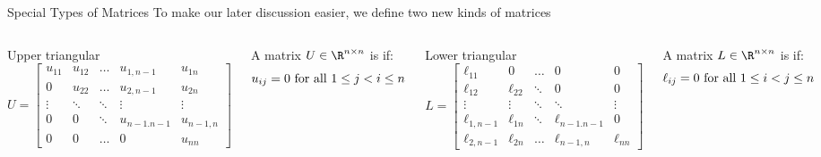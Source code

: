 \documentclass[xcoler=dvipsnames, aspectratio=169]{beamer}
\begin{document}
    \begin{frame}{Special Types of Matrices}
        To make our later discussion easier, we define two new kinds of matrices\pause
        \begin{columns}
            Upper triangular
            \pause
            \[
                U = \begin{bmatrix}
                    u_{11} & u_{12} & \dots & u_{1,n-1}& u_{1n}\\
                    0 & u_{22} & \dots & u_{2,n-1} & u_{2n}\\
                    \vdots & \ddots & \ddots & \vdots & \vdots\\
                    0 & 0 & \ddots & u_{n-1.n-1} & u_{n-1,n}\\
                    0 & 0 & \dots & 0 & u_{nn}
                \end{bmatrix}
            \]
            \pause
            \begin{defn}
                A matrix $U\in\R^{n\times n}$ is  if:\pause
                \[
                    u_{ij} = 0 \textnormal{ for all } 1\leq j < i \leq n
                \]
            \end{defn}
            Lower triangular
            \pause
            \[
                L = \begin{bmatrix}
                    \ell_{11}   & 0 & \dots  &0           & 0 \\
                    \ell_{12}   & \ell_{22} & \ddots  &0           & 0 \\
                    \vdots      & \vdots    & \ddots & \ddots         & \vdots\\
                    \ell_{1,n-1}& \ell_{1n}         & \ddots & \ell_{n-1.n-1} & 0\\
                    \ell_{2,n-1}& \ell_{2n}         & \dots  & \ell_{n-1,n}   & \ell_{nn}
                \end{bmatrix}
            \]
            \pause
            \begin{defn}
                A matrix $L\in\R^{n\times n}$ is  if:\pause
                \[
                    \ell_{ij} = 0 \textnormal{ for all } 1\leq i < j \leq n
                \]
            \end{defn}
        \end{columns}
    \end{frame}
\end{document}
